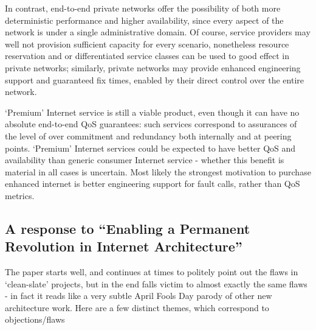 In contrast, end-to-end private networks offer the possibility of both more deterministic performance and higher availability, since every aspect of the network is under a single administrative domain.
Of course, service providers may well not provision sufficient capacity for every scenario, nonetheless resource reservation and or differentiated service classes can be used to good effect in private networks; similarly, private networks may provide enhanced engineering support and guaranteed fix times, enabled by their direct control over the entire network.

‘Premium’ Internet service is still a viable product, even though it can have no absolute end-to-end QoS guarantees: such services correspond to assurances of the level of over commitment and redundancy both internally and at peering points.
‘Premium’ Internet services could be expected to have better QoS and availability than generic consumer Internet service - whether this benefit is material in all cases is uncertain.
Most likely the strongest motivation to purchase enhanced internet is better engineering support for fault calls, rather than QoS metrics.


\subsection{A response to “Enabling a Permanent Revolution in Internet Architecture”}

The paper\cite{mccauley2019} starts well, and continues at times to politely point out the flaws in ‘clean-slate’ projects, but in the end falls victim to almost exactly the same flaws - in fact it reads like a very subtle April Fools Day parody of other new architecture work.
Here are a few distinct themes, which correspond to objections/flaws

